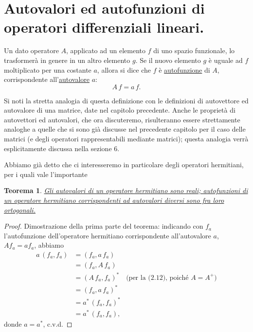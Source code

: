 \documentclass[11pt, a4paper]{book}
\numberwithin{equation}{section}
\newtheorem{teorema}{Teorema}[section]
\begin{document}
\section{Autovalori ed autofunzioni di operatori differenziali lineari.}

Un dato operatore $A$, applicato ad un elemento $f$ di uno spazio
funzionale, lo trasformerà in genere in un altro elemento $g$. Se il
nuovo elemento $g$ è uguale ad $f$ moltiplicato per una costante $a$,
allora si dice che $f$ è \underline{autofunzione} di $A$, corrispondente
all'\underline{autovalore} $a$:
\begin{equation}
A\,f = a\,f.
\end{equation}

Si noti la stretta analogia di questa definizione con le definizioni di
autovettore ed autovalore di una matrice, date nel capitolo precedente.
Anche le proprietà di autovettori ed autovalori, che ora discuteremo,
risulteranno essere strettamente analoghe a quelle che si sono già
discusse nel precedente capitolo per il caso delle matrici (e degli
operatori rappresentabili mediante matrici); questa analogia verrà
esplicitamente discussa nella sezione 6.

Abbiamo già detto che ci interesseremo in particolare degli operatori
hermitiani, per i quali vale l'importante

\begin{teorema}
\uline{Gli autovalori di un operatore hermitiano sono reali; autofunzioni
di un operatore hermitiano corrispondenti ad autovalori diversi sono fra
loro ortogonali.}
\end{teorema}

\begin{proof}
Dimostrazione della prima parte del teorema: indicando con $f_a$
l'autofunzione dell'operatore hermitiano corrispondente all'autovalore
$a$, $Af_a = af_a$, abbiamo
\begin{align*}
a\,(f_a, f_a) &= (f_a, a\,f_a) \\
  &= (f_a, A\,f_a) \\
  &= (A\,f_a, f_a)^* \quad \text{(per la (2.12), poiché }A=A^+\text{)} \\
  &= (f_a, a\,f_a)^* \\
  &= a^*\,(f_a,f_a)^* \\
  &= a^*\,(f_a,f_a),
\end{align*}
donde $a = a^*$, c.v.d.
\end{proof}

\end{document}
